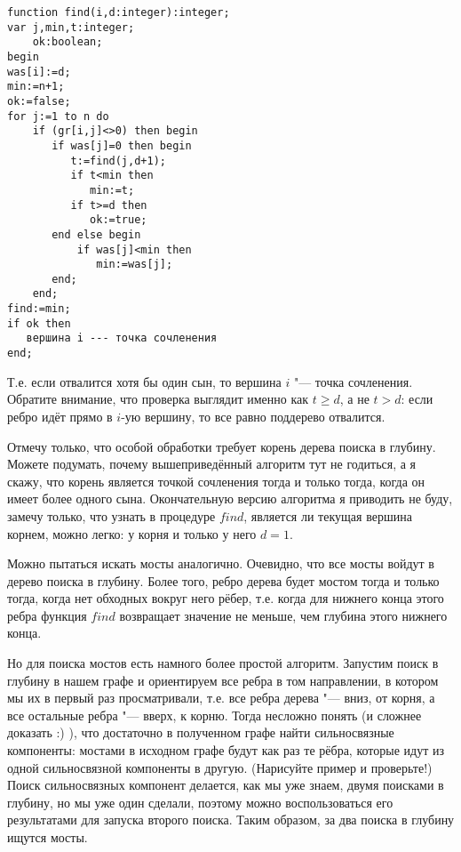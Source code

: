 \begin{codesample}\begin{verbatim}
function find(i,d:integer):integer;
var j,min,t:integer;
    ok:boolean;
begin
was[i]:=d;
min:=n+1;
ok:=false;
for j:=1 to n do
    if (gr[i,j]<>0) then begin
       if was[j]=0 then begin
          t:=find(j,d+1);
          if t<min then
             min:=t;
          if t>=d then
             ok:=true;
       end else begin
           if was[j]<min then
              min:=was[j];
       end;
    end;
find:=min;
if ok then
   вершина i --- точка сочленения
end;
\end{verbatim}
\end{codesample}
Т.е. если отвалится хотя бы один сын, то вершина $i$ "--- точка сочленения. Обратите внимание, что проверка выглядит
именно как $t\geq d$, а не $t>d$: если ребро идёт прямо в $i$-ую вершину, то все равно поддерево отвалится.

Отмечу только, что особой обработки требует корень дерева поиска в глубину. Можете подумать, почему вышеприведённый 
алгоритм тут не годиться, а я скажу, что корень является точкой сочленения тогда и только тогда, когда он
имеет более одного сына. Окончательную версию алгоритма я приводить не буду, замечу только, что узнать в
процедуре $find$, является ли текущая вершина корнем, можно легко: у корня и только у него $d=1$.

 Можно пытаться искать мосты аналогично. Очевидно, что все мосты войдут в дерево поиска в глубину.
Более того, ребро дерева будет мостом тогда и только тогда, когда нет обходных вокруг него рёбер, т.е. когда для
нижнего конца этого ребра функция $find$ возвращает значение не меньше, чем глубина этого нижнего конца.


Но для поиска мостов есть намного более простой алгоритм. Запустим поиск в глубину в нашем графе и ориентируем 
все ребра в том направлении, в котором мы их в первый раз просматривали, т.е. все ребра дерева "---
вниз, от корня, а все остальные ребра "--- вверх, к корню. Тогда несложно понять (и сложнее доказать :) ),
что достаточно в полученном графе найти сильносвязные компоненты: мостами в исходном графе будут как раз те рёбра,
которые идут из одной сильносвязной компоненты в другую. (Нарисуйте пример и проверьте!) Поиск сильносвязных компонент
делается, как мы уже знаем, двумя поисками в глубину, но мы уже один сделали, поэтому можно воспользоваться
его результатами для запуска второго поиска. Таким образом, за два поиска в глубину ищутся мосты.

